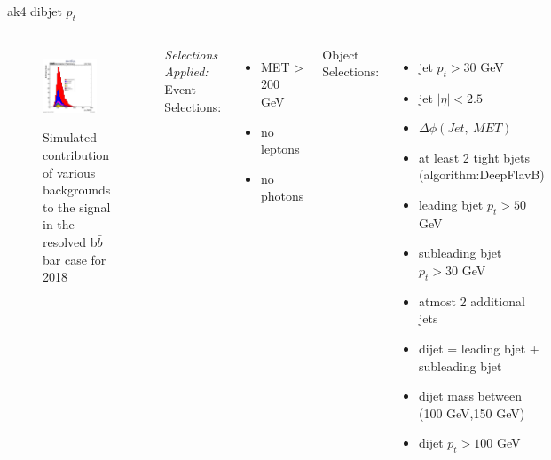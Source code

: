 \documentclass[10pt,xcolor=dvipsnames,aspectratio=169]{beamer}
\begin{document}
\begin{frame}[fragile]{ak4 dibjet $p_t$}
  \begin{columns}
    \begin{figure}
      \centering
      \includegraphics[width=0.8\textwidth]{../Backgrounds/plots/SR_Resolved_Backgrounds_dijets_pt_Combined.png}
      \label{contribution}
      \caption{Simulated contribution of various backgrounds to the signal in the resolved b$ \bar{b} $ bar case for 2018}
    \end{figure}
    \textit{Selections Applied:} \\
    Event Selections:
    \begin{itemize}
      \raggedright 
      \tiny
      \item {MET > 200 GeV}
      \item {no leptons}
      \item {no photons}
    \end{itemize}
    Object Selections:
    \begin{itemize}
      \raggedright 
      \tiny
      \item {jet $p_t > 30 $ GeV}
      \item {jet $| \eta | < 2.5 $}
      \item {$\Delta \phi (Jet, \ MET)$}
      \item {at least 2 tight bjets (algorithm:DeepFlavB)}
      \item {leading bjet $p_t > 50 $ GeV}
      \item {subleading bjet $p_t > 30 $ GeV}
      \item {atmost 2 additional jets}
      \item {dijet = leading bjet + subleading bjet}
      \item {dijet mass between (100 GeV,150 GeV)}
      \item {dijet $p_t > 100 $ GeV}
    \end{itemize}
  \end{columns}
\end{frame}
\end{document}

